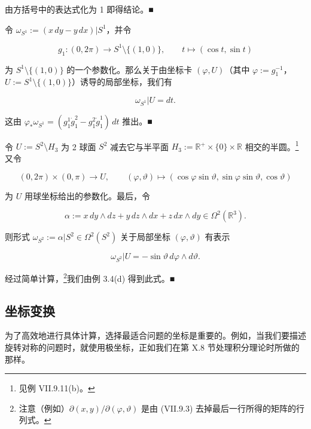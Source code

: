 \begin{example}
\begin{items}
由方括号中的表达式化为 1 即得结论。\nobreak\hspace{0.35em}■

\item

令 $ \omega_{S^{1}} := (x\,dy - y\,dx)|S^{1} $，并令

\[
g_{1}: (0,2\pi) \to S^{1}\setminus\{(1,0)\}, \qquad t \mapsto (\cos t, \sin t)
\]

为 $ S^{1}\setminus\{(1,0)\} $ 的一个参数化。那么关于由坐标卡 $ (\varphi, U) $（其中 $ \varphi := g_{1}^{-1} $，$ U := S^{1}\setminus\{(1,0)\} $）诱导的局部坐标，我们有

\[
\omega_{S^{1}}|U = dt .
\]

\proofhead
这由 $ \varphi_{\ast}\omega_{S^{1}} = (g_{1}^{1}\dot{g}_{1}^{2} - g_{1}^{2}\dot{g}_{1}^{1})\,dt $ 推出。\nobreak\hspace{0.35em}■
\item

令 $ U := S^{2}\setminus H_{3} $ 为 2 球面 $ S^{2} $ 减去它与半平面 $ H_{3} := \mathbb{R}^{+}\times\{0\}\times\mathbb{R} $ 相交的半圆。\footnote{见例 VII.9.11(b)。}又令

\[
(0,2\pi)\times(0,\pi) \to U, \qquad (\varphi,\vartheta) \mapsto (\cos\varphi\sin\vartheta, \sin\varphi\sin\vartheta, \cos\vartheta)
\]

为 $ U $ 用球坐标给出的参数化。最后，令

\[
\alpha := x\,dy\wedge dz + y\,dz\wedge dx + z\,dx\wedge dy \in \Omega^{2}(\mathbb{R}^{3}) .
\]

则形式 $ \omega_{S^{2}} := \alpha|S^{2} \in \Omega^{2}(S^{2}) $ 关于局部坐标 $ (\varphi,\vartheta) $ 有表示

\[
\omega_{S^{2}}|U = -\sin\vartheta\,d\varphi\wedge d\vartheta .
\]

\proofhead
经过简单计算，\footnote{注意（例如）$ \partial(x,y)/\partial(\varphi,\vartheta) $ 是由 (VII.9.3) 去掉最后一行所得的矩阵的行列式。}我们由例 3.4(d) 得到此式。\nobreak\hspace{0.35em}■
\end{items}

\end{example}

\subsection*{坐标变换}

为了高效地进行具体计算，选择最适合问题的坐标是重要的。例如，当我们要描述旋转对称的问题时，就使用极坐标，正如我们在第 X.8 节处理积分理论时所做的那样。

